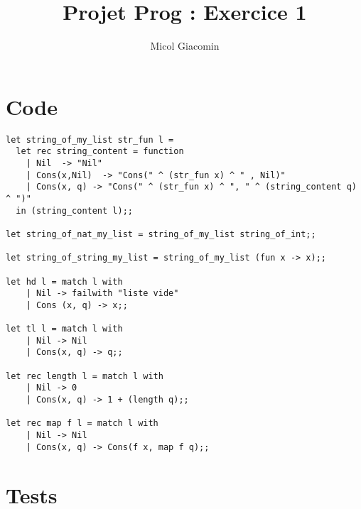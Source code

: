 \documentclass{article}
\title{Projet Prog : Exercice 1}
\author{Micol Giacomin}
\begin{document}
\maketitle

\section{Code}

\begin{verbatim}
let string_of_my_list str_fun l = 
  let rec string_content = function
    | Nil  -> "Nil"
    | Cons(x,Nil)  -> "Cons(" ^ (str_fun x) ^ " , Nil)"
    | Cons(x, q) -> "Cons(" ^ (str_fun x) ^ ", " ^ (string_content q) ^ ")"
  in (string_content l);;

let string_of_nat_my_list = string_of_my_list string_of_int;;

let string_of_string_my_list = string_of_my_list (fun x -> x);;

let hd l = match l with
    | Nil -> failwith "liste vide"
    | Cons (x, q) -> x;;

let tl l = match l with
    | Nil -> Nil
    | Cons(x, q) -> q;;

let rec length l = match l with
    | Nil -> 0 
    | Cons(x, q) -> 1 + (length q);;

let rec map f l = match l with
    | Nil -> Nil
    | Cons(x, q) -> Cons(f x, map f q);;
\end{verbatim}




\section{Tests}
\end{document}
